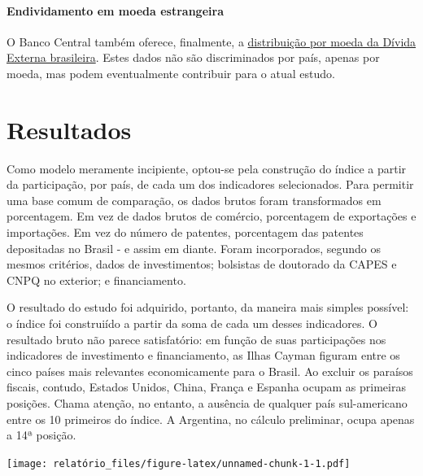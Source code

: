 \documentclass[
]{article}
\begin{document}
\hypertarget{endividamento-em-moeda-estrangeira}{%
\paragraph{Endividamento em moeda
estrangeira}\label{endividamento-em-moeda-estrangeira}}

O Banco Central também oferece, finalmente, a
\href{https://www.bcb.gov.br/content/estatisticas/Documents/Tabelas_especiais/DivMoeda_T.xlsx}{distribuição
por moeda da Dívida Externa brasileira}. Estes dados não são
discriminados por país, apenas por moeda, mas podem eventualmente
contribuir para o atual estudo.

\hypertarget{resultados}{%
\section{Resultados}\label{resultados}}

Como modelo meramente incipiente, optou-se pela construção do índice a
partir da participação, por país, de cada um dos indicadores
selecionados. Para permitir uma base comum de comparação, os dados
brutos foram transformados em porcentagem. Em vez de dados brutos de
comércio, porcentagem de exportações e importações. Em vez do número de
patentes, porcentagem das patentes depositadas no Brasil - e assim em
diante. Foram incorporados, segundo os mesmos critérios, dados de
investimentos; bolsistas de doutorado da CAPES e CNPQ no exterior; e
financiamento.

O resultado do estudo foi adquirido, portanto, da maneira mais simples
possível: o índice foi construiído a partir da soma de cada um desses
indicadores. O resultado bruto não parece satisfatório: em função de
suas participações nos indicadores de investimento e financiamento, as
Ilhas Cayman figuram entre os cinco países mais relevantes
economicamente para o Brasil. Ao excluir os paraísos fiscais, contudo,
Estados Unidos, China, França e Espanha ocupam as primeiras posições.
Chama atenção, no entanto, a ausência de qualquer país sul-americano
entre os 10 primeiros do índice. A Argentina, no cálculo preliminar,
ocupa apenas a 14ª posição.

\texttt{[image: relatório\_files/figure-latex/unnamed-chunk-1-1.pdf]}
\newpage \begingroup\fontsize{9}{11}\selectfont
\end{document}
